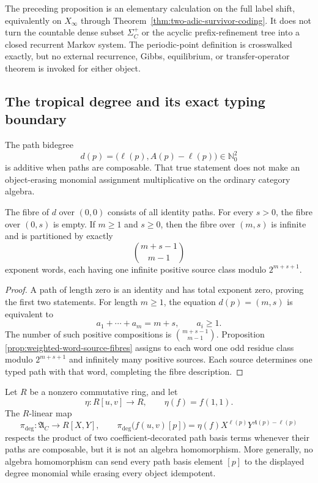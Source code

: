 \begin{nonclaim}
The preceding proposition is an elementary calculation on the full label
shift, equivalently on $X_\infty$ through
Theorem~\ref{thm:two-adic-survivor-coding}.  It does not turn the countable
dense subset $\Sigma_C^+$ or the acyclic prefix-refinement tree into a closed
recurrent Markov system.  The periodic-point definition is crosswalked
exactly, but no external recurrence, Gibbs, equilibrium, or transfer-operator
theorem is invoked for either object.
\end{nonclaim}

\subsection{The tropical degree and its exact typing boundary}

The path bidegree
\[
 d(p)=\bigl(\ell(p),A(p)-\ell(p)\bigr)\in\mathbb N_0^2
\]
is additive when paths are composable.  That true statement does not make an
object-erasing monomial assignment multiplicative on the ordinary category
algebra.

\begin{proposition}
\label{prop:exact-path-degree-fibres}
The fibre of $d$ over $(0,0)$ consists of all identity paths.  For every
$s>0$, the fibre over $(0,s)$ is empty.  If $m\geq1$ and $s\geq0$, then the
fibre over $(m,s)$ is infinite and is partitioned by exactly
\[
 \binom{m+s-1}{m-1}
\]
exponent words, each having one infinite positive source class modulo
$2^{m+s+1}$.
\end{proposition}

\begin{proof}
A path of length zero is an identity and has total exponent zero, proving the
first two statements.  For length $m\geq1$, the equation
$d(p)=(m,s)$ is equivalent to
\[
 a_1+\cdots+a_m=m+s,
 \qquad a_i\geq1.
\]
The number of such positive compositions is
$\binom{m+s-1}{m-1}$.  Proposition
\ref{prop:weighted-word-source-fibres} assigns to each word one odd residue
class modulo $2^{m+s+1}$ and infinitely many positive sources.  Each source
determines one typed path with that word, completing the fibre description.
\end{proof}

\begin{proposition}
\label{prop:degree-shadow-composable-only}
Let $R$ be a nonzero commutative ring, and let
\[
 \eta:R[u,v]\longrightarrow R,
 \qquad \eta(f)=f(1,1).
\]
The $R$-linear map
\[
 \pi_{\mathrm{deg}}:\mathfrak A_C\longrightarrow R[X,Y],
 \qquad
 \pi_{\mathrm{deg}}\bigl(f(u,v)[p]\bigr)
 =\eta(f)X^{\ell(p)}Y^{A(p)-\ell(p)}
\]
respects the product of two coefficient-decorated path basis terms whenever
their paths are composable, but it is not an algebra homomorphism.  More
generally, no algebra homomorphism can send every path basis element $[p]$ to
the displayed degree monomial while erasing every object idempotent.
\end{proposition}

